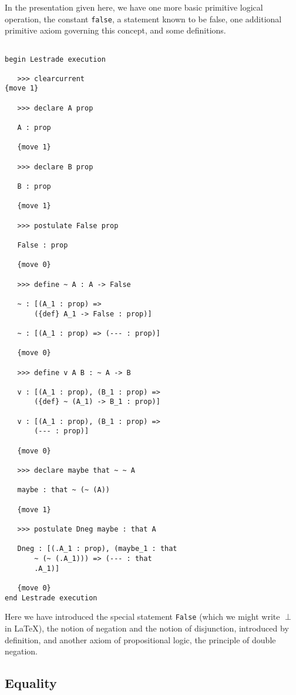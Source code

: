 \documentclass[12pt]{article}
\begin{document}
In the presentation given here, we have one more basic primitive logical operation, the constant {\tt false}, a statement known to be false, one additional primitive axiom governing this concept, and some definitions.

\begin{verbatim}

begin Lestrade execution

   >>> clearcurrent
{move 1}

   >>> declare A prop

   A : prop

   {move 1}

   >>> declare B prop

   B : prop

   {move 1}

   >>> postulate False prop

   False : prop

   {move 0}

   >>> define ~ A : A -> False

   ~ : [(A_1 : prop) => 
       ({def} A_1 -> False : prop)]

   ~ : [(A_1 : prop) => (--- : prop)]

   {move 0}

   >>> define v A B : ~ A -> B

   v : [(A_1 : prop), (B_1 : prop) => 
       ({def} ~ (A_1) -> B_1 : prop)]

   v : [(A_1 : prop), (B_1 : prop) => 
       (--- : prop)]

   {move 0}

   >>> declare maybe that ~ ~ A

   maybe : that ~ (~ (A))

   {move 1}

   >>> postulate Dneg maybe : that A

   Dneg : [(.A_1 : prop), (maybe_1 : that 
       ~ (~ (.A_1))) => (--- : that 
       .A_1)]

   {move 0}
end Lestrade execution

\end{verbatim}

Here we have introduced the special statement {\tt False} (which we might write $\perp$ in LaTeX), the notion of negation and the notion of disjunction, introduced by definition, and another axiom of propositional logic, the principle of double negation.

\subsection{Equality}
\end{document}
